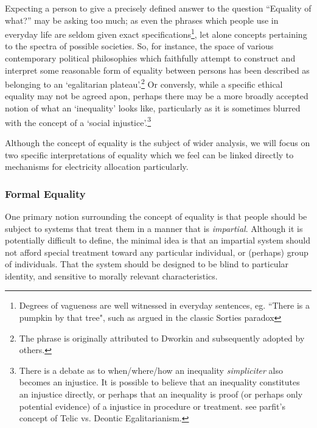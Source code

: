 Expecting a person to give a precisely defined answer to the question ``Equality of what?'' may be asking too much; as even the phrases which people use in everyday life are seldom given exact specifications\footnote{Degrees of vagueness are well witnessed in everyday sentences, eg. ``There is a pumpkin by that tree", such as argued in the classic Sorties paradox\cite{frances_2018}}, let alone concepts pertaining to the spectra of possible societies.
So, for instance, the space of various contemporary political philosophies which faithfully attempt to construct and interpret some reasonable form of equality between persons has been described as belonging to an `egalitarian plateau'.\footnote{The phrase is originally attributed to Dworkin and subsequently adopted by others.}\cite{Brown2007}
Or conversly, while a specific ethical equality may not be agreed apon, perhaps there may be a more broadly accepted notion of what an `inequality' looks like,
particularly as it is sometimes blurred with the concept of a `social injustice'.\footnote{There is a debate as to when/where/how an inequality \textit{simpliciter} also becomes an injustice. It is possible to believe that an inequality constitutes an injustice directly, or perhaps that an inequality is proof (or perhaps only potential evidence) of a injustice in procedure or treatment. see parfit's concept of Telic vs. Deontic Egalitarianism.}



Although the concept of equality is the subject of wider analysis, we will focus on two specific interpretations of equality which we feel can be linked directly to mechanisms for electricity allocation particularly.


\subsubsection{Formal Equality}

One primary notion surrounding the concept of equality is that people should be subject to systems that treat them in a manner that is \textit{impartial}. Although it is potentially difficult to define, the minimal idea is that an impartial system should not afford special treatment toward any particular individual, or (perhaps) group of individuals. That the system should be designed to be blind to particular identity, and sensitive to morally relevant characteristics.

